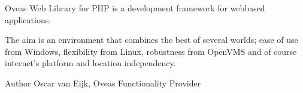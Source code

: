 Oveas Web Library for PHP is a development framework for webbased applications.

The aim is an environment that combines the best of several worlds; ease of use from Windows, flexibility from Linux, robustness from OpenVMS and of course internet's platform and location independency. \begin{DoxyAuthor}{Author}
Oscar van Eijk, Oveas Functionality Provider 
\end{DoxyAuthor}
